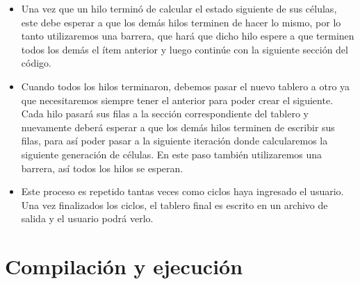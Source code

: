 \documentclass[11pt]{article}
\begin{document}
{\begin{itemize}
            \item Una vez que un hilo terminó de calcular el estado siguiente de sus células, este debe esperar a que los demás hilos terminen de hacer lo mismo, por lo tanto utilizaremos una barrera, que hará que dicho hilo espere a que terminen todos los demás el ítem anterior y luego continúe con la siguiente sección del código.
            \item Cuando todos los hilos terminaron, debemos pasar el nuevo tablero a otro ya que necesitaremos siempre tener el anterior para poder crear el siguiente. Cada hilo pasará sus filas a la sección correspondiente del tablero y nuevamente deberá esperar a que los demás hilos terminen de escribir sus filas, para así poder pasar a la siguiente iteración donde calcularemos la siguiente generación de células. En este paso también utilizaremos una barrera, así todos los hilos se esperan.
            \item Este proceso es repetido tantas veces como ciclos haya ingresado el usuario. Una vez finalizados los ciclos, el tablero final es escrito en un archivo de salida y el usuario podrá verlo.
        \end{itemize}
    }
    
\section{Compilación y ejecución}
\end{document}
